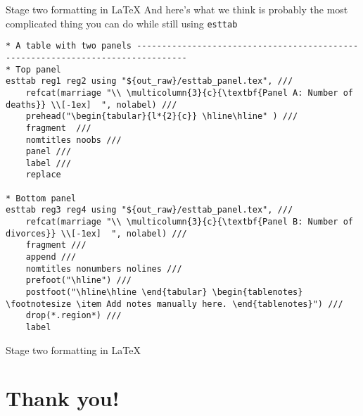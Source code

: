 \documentclass[aspectratio=169]{beamer}
\begin{document}
\begin{frame}[fragile]{Stage two formatting in \LaTeX }
And here's what we think is probably the most complicated thing you can do while still using \texttt{esttab}

\begin{lstlisting}
* A table with two panels --------------------------------------------------------------------------------
* Top panel
esttab reg1 reg2 using "${out_raw}/esttab_panel.tex", ///
    refcat(marriage "\\ \multicolumn{3}{c}{\textbf{Panel A: Number of deaths}} \\[-1ex]  ", nolabel) ///
    prehead("\begin{tabular}{l*{2}{c}} \hline\hline" ) ///
    fragment  ///
    nomtitles noobs ///
    panel ///
    label ///
    replace

* Bottom panel
esttab reg3 reg4 using "${out_raw}/esttab_panel.tex", ///
    refcat(marriage "\\ \multicolumn{3}{c}{\textbf{Panel B: Number of divorces}} \\[-1ex]  ", nolabel) ///
    fragment ///
    append ///
    nomtitles nonumbers nolines ///
    prefoot("\hline") ///
    postfoot("\hline\hline \end{tabular} \begin{tablenotes} \footnotesize \item Add notes manually here. \end{tablenotes}") ///
    drop(*.region*) ///
    label
\end{lstlisting}
\end{frame}

\begin{frame}[fragile]{Stage two formatting in \LaTeX }
\begin{table}
\scriptsize
\begin{adjustbox}{max width = .3\textwidth}
\begin{threeparttable}

\end{threeparttable}
\end{adjustbox}
\end{table}
\end{frame}

\section{Thank you!}
\end{document}
